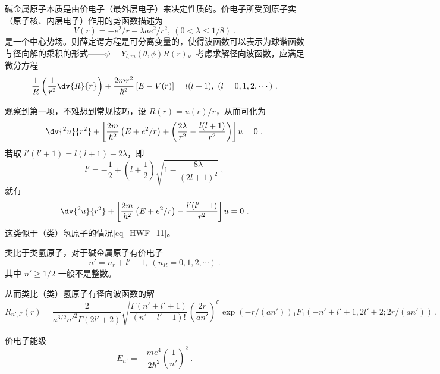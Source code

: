

碱金属原子本质是由价电子（最外层电子）来决定性质的。价电子所受到原子实（原子核、内层电子）作用的势函数描述为
\begin{equation}
V(r) = -e^2/r - \lambda a e^2/r^2, \ (0 < \lambda \le 1/8) ~.
\end{equation}
是一个中心势场。则薛定谔方程是可分离变量的，使得波函数可以表示为球谐函数与径向解的乘积的形式——$\psi = Y_{l, m}(\theta, \phi) R(r)$。考虑求解径向波函数，应满足微分方程
\begin{equation}\label{eq_AlkmQM_1}
\frac{1}{R} \left(\frac{1}{r^2} \dv{R}{r}\right) + \frac{2mr^2}{\hbar^2} \left[E - V(r)\right] = l(l+1), \ (l = 0, 1, 2, \cdots)~.
\end{equation}

观察到第一项，不难想到常规技巧，设 $R(r) = u(r) /r$，从而可化为
\begin{equation}
\dv{^2 u}{r^2} + \left[\frac{2m}{\hbar^2}\left(E + e^2/r\right) + \left(\frac{2 \lambda}{r^2} - \frac{l(l+1)}{r^2}\right)\right]u = 0 ~.
\end{equation}
若取 $l'(l'+1) = l(l+1) - 2\lambda$，即
$$l' = -\frac12 + \left(l + \frac12\right) \sqrt{1 - \frac{8\lambda}{(2l+1)^2}} ~,$$
就有
\begin{equation}
\dv{^2 u}{r^2} + \left[\frac{2m}{\hbar^2}\left(E + e^2/r\right) - \frac{l'(l'+1)}{r^2}\right]u = 0 ~.
\end{equation}
这类似于（类）氢原子的情况\autoref{eq_HWF_11}。

类比于类氢原子，对于碱金属原子有价电子
$$n' = n_r + l' + 1, \ (n_R = 0, 1, 2, \cdots) ~.$$
其中 $n' \ge 1/2$ 一般不是整数。

从而类比（类）氢原子有径向波函数的解
\begin{equation}
R_{n', l'}(r) = \frac{2}{a^{3/2} n'^2 \Gamma(2l'+2)}\sqrt{\frac{\Gamma(n'+l'+1)}{(n'-l'-1)!}} \left(\frac{2r}{an'}\right)^{l'} \exp(-r/(an')) {_1F_1}(-n'+l'+1, 2l'+2; 2r/(an'))~.
\end{equation}

价电子能级
\begin{equation}
E_{n'} = -\frac{me^4}{2\hbar^2} \left(\frac{1}{n'}\right)^2 ~.
\end{equation}

